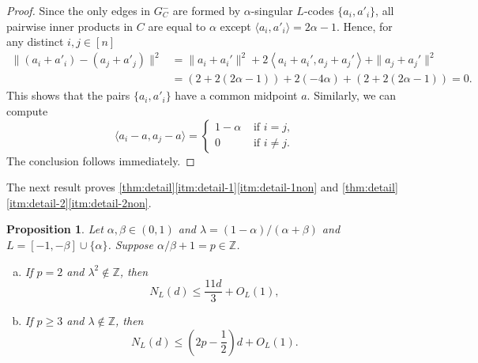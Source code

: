 \documentclass[reqno, 11pt]{amsart}
\newtheorem{proposition}[theorem]{Proposition}
\theoremstyle{definition}
\theoremstyle{remark}
\newcommand{\ang}[1]{\left\langle #1 \right\rangle}
\newcommand{\paren}[1]{\left( #1 \right)}
\newcommand{\ZZ}{\mathbb{Z}}
\begin{document}
\begin{proof}   
    Since the only edges in $G_C^-$ are formed by $\alpha$-singular $L$-codes $\{ a_i, a'_i\}$, all pairwise inner products in $C$ are equal to $\alpha$ except $\langle  a_i, a'_i \rangle = 2\alpha -1 $.
    Hence, for any distinct $i, j \in [n]$ 
    \begin{align*}
        \|( a_i + a'_i) - ( a_j + a'_j)\|^2 &= \|a_i + a_i'\|^2 + 2 \ang{a_i + a_i', a_j + a_j'} + \|a_j + a_j'\|^2 \\
        &=\paren{2 + 2(2\alpha - 1)} + 2 \paren{-4\alpha} + \paren{2 + 2(2\alpha - 1)} = 0.
     \end{align*}
     This shows that the pairs $\{ a_i, a'_i\}$ have a common midpoint $ a$. Similarly, we can compute  
    \[
        \langle  a_i -  a,  a_j -  a\rangle = \begin{cases}
            1-\alpha &\text{ if } i = j, \\
            0 &\text{ if } i \neq j.
                                                 \end{cases}
    \]
	The conclusion follows immediately. 
\end{proof}

The next result proves \cref{thm:detail}\ref{itm:detail-1}\ref{itm:detail-1non} and \cref{thm:detail}\ref{itm:detail-2}\ref{itm:detail-2non}.

\begin{proposition}\label{prop:algebraic-upper}
    Let $ \alpha, \beta \in (0,1)$ and $\lambda = (1-\alpha)/(\alpha + \beta)$ and $L = [-1, -\beta]\cup\{\alpha\}$. Suppose $\alpha/\beta + 1 = p \in \ZZ$.  
    \begin{enumerate}[(a)]
        \item\label{itm:algebraic-upper-2} If $p = 2$ and $\lambda^2 \notin \ZZ$, then 
        \[
            N_L(d) \leq \frac{11d}{3} + O_L(1),
        \]
        \item\label{itm:algebraic-upper-p} If $p \geq 3$ and $\lambda \notin \ZZ$, then 
        \[
            N_L(d) \leq \left(2p-\frac{1}{2}\right)d + O_L(1).
        \]
    \end{enumerate}
    \end{proposition}
   
\end{document}
